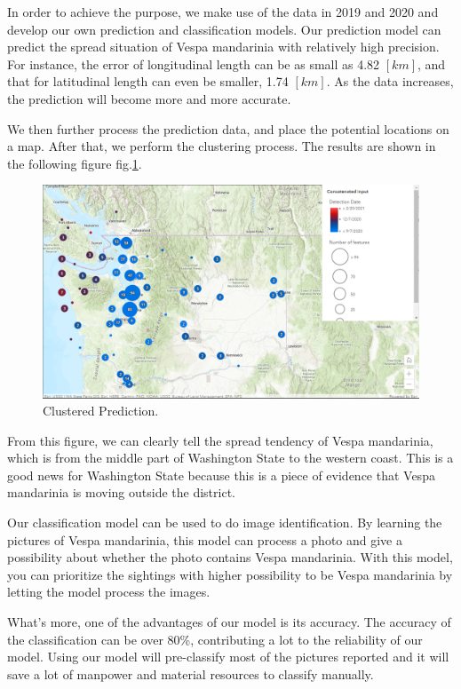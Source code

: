 \documentclass{mcmthesis}
\begin{document}
In order to achieve the purpose, we make use of the data in 2019 and 2020 and develop our own prediction and classification models. Our prediction model can predict the spread situation of Vespa mandarinia with relatively high precision. For instance, the error of longitudinal length can be as small as 4.82 $[km]$, and that for latitudinal length can even be smaller, 1.74 $[km]$. As the data increases, the prediction will become more and more accurate.

We then further process the prediction data, and place the potential locations on a map. After that, we perform the clustering process. The results are shown in the following figure fig.\ref{fig:con}.
\begin{figure}[!htbp]
	\centering
 	\includegraphics[width = 1\textwidth]{Concatenated_Clustered.png} 
	\caption{Clustered Prediction.}
	\label{fig:con}
\end{figure}

From this figure, we can clearly tell the spread tendency of Vespa mandarinia, which is from the middle part of Washington State to the western coast. This is a good news for Washington State because this is a piece of evidence that Vespa mandarinia is moving outside the district.

Our classification model can be used to do image identification. By learning the pictures of Vespa mandarinia, this model can process a photo and give a possibility about whether the photo contains Vespa mandarinia. With this model, you can prioritize the sightings with higher possibility to be Vespa mandarinia by letting the model process the images.

What’s more, one of the advantages of our model is its accuracy. The accuracy of the classification can be over 80\%, contributing a lot to the reliability of our model. Using our model will pre-classify most of the pictures reported and it will save a lot of manpower and material resources to classify manually.
\end{document}
